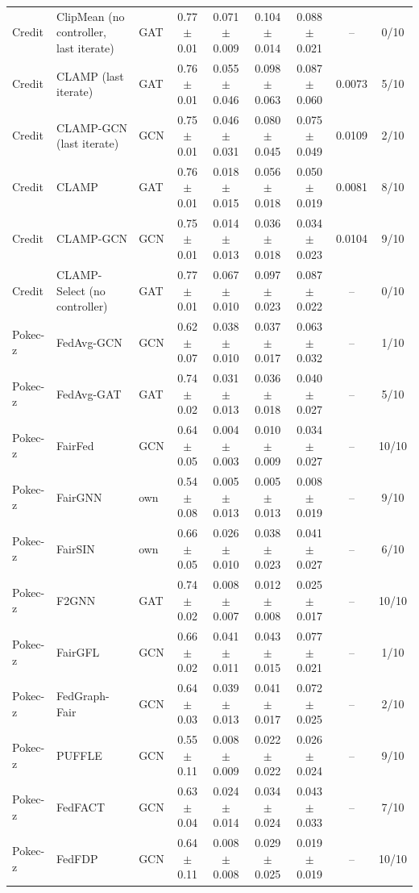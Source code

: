 \begin{longtable}{lp{3.2cm}lcccccc}
Credit & ClipMean (no controller, last iterate) & GAT & 0.77$\pm$0.01 & 0.071$\pm$0.009 & 0.104$\pm$0.014 & 0.088$\pm$0.021 & -- & 0/10 \\
Credit & CLAMP (last iterate) & GAT & 0.76$\pm$0.01 & 0.055$\pm$0.046 & 0.098$\pm$0.063 & 0.087$\pm$0.060 & 0.0073 & 5/10 \\
Credit & CLAMP-GCN (last iterate) & GCN & 0.75$\pm$0.01 & 0.046$\pm$0.031 & 0.080$\pm$0.045 & 0.075$\pm$0.049 & 0.0109 & 2/10 \\
Credit & CLAMP & GAT & 0.76$\pm$0.01 & 0.018$\pm$0.015 & 0.056$\pm$0.018 & 0.050$\pm$0.019 & 0.0081 & 8/10 \\
Credit & CLAMP-GCN & GCN & 0.75$\pm$0.01 & 0.014$\pm$0.013 & 0.036$\pm$0.018 & 0.034$\pm$0.023 & 0.0104 & 9/10 \\
Credit & CLAMP-Select (no controller) & GAT & 0.77$\pm$0.01 & 0.067$\pm$0.010 & 0.097$\pm$0.023 & 0.087$\pm$0.022 & -- & 0/10 \\
Pokec-z & FedAvg-GCN & GCN & 0.62$\pm$0.07 & 0.038$\pm$0.010 & 0.037$\pm$0.017 & 0.063$\pm$0.032 & -- & 1/10 \\
Pokec-z & FedAvg-GAT & GAT & 0.74$\pm$0.02 & 0.031$\pm$0.013 & 0.036$\pm$0.018 & 0.040$\pm$0.027 & -- & 5/10 \\
Pokec-z & FairFed & GCN & 0.64$\pm$0.05 & 0.004$\pm$0.003 & 0.010$\pm$0.009 & 0.034$\pm$0.027 & -- & 10/10 \\
Pokec-z & FairGNN & own & 0.54$\pm$0.08 & 0.005$\pm$0.013 & 0.005$\pm$0.013 & 0.008$\pm$0.019 & -- & 9/10 \\
Pokec-z & FairSIN & own & 0.66$\pm$0.05 & 0.026$\pm$0.010 & 0.038$\pm$0.023 & 0.041$\pm$0.027 & -- & 6/10 \\
Pokec-z & F2GNN & GAT & 0.74$\pm$0.02 & 0.008$\pm$0.007 & 0.012$\pm$0.008 & 0.025$\pm$0.017 & -- & 10/10 \\
Pokec-z & FairGFL & GCN & 0.66$\pm$0.02 & 0.041$\pm$0.011 & 0.043$\pm$0.015 & 0.077$\pm$0.021 & -- & 1/10 \\
Pokec-z & FedGraph-Fair & GCN & 0.64$\pm$0.03 & 0.039$\pm$0.013 & 0.041$\pm$0.017 & 0.072$\pm$0.025 & -- & 2/10 \\
Pokec-z & PUFFLE & GCN & 0.55$\pm$0.11 & 0.008$\pm$0.009 & 0.022$\pm$0.022 & 0.026$\pm$0.024 & -- & 9/10 \\
Pokec-z & FedFACT & GCN & 0.63$\pm$0.04 & 0.024$\pm$0.014 & 0.034$\pm$0.024 & 0.043$\pm$0.033 & -- & 7/10 \\
Pokec-z & FedFDP & GCN & 0.64$\pm$0.11 & 0.008$\pm$0.008 & 0.029$\pm$0.025 & 0.019$\pm$0.019 & -- & 10/10 \\

\end{longtable}

